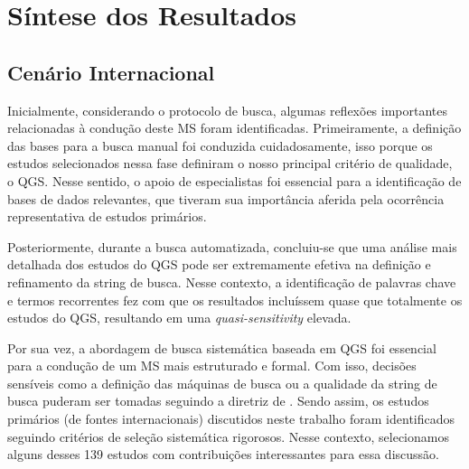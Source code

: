 


\section{Síntese dos Resultados}
\label{ms:sintese-resultados}

\subsection{Cenário Internacional}
\label{ms:cenario-internacional}

Inicialmente, considerando o protocolo de busca, algumas reflexões importantes relacionadas à condução deste MS foram identificadas. Primeiramente, a definição das bases para a busca manual foi conduzida cuidadosamente, isso porque os estudos selecionados nessa fase definiram o nosso principal critério de qualidade, o QGS. Nesse sentido, o apoio de especialistas foi essencial para a identificação de bases de dados relevantes, que tiveram sua importância aferida pela ocorrência representativa de estudos primários.


Posteriormente, durante a busca automatizada, concluiu-se que uma análise mais detalhada dos estudos do QGS pode ser extremamente efetiva na definição e refinamento da string de busca. Nesse contexto, a identificação de palavras chave e termos recorrentes fez com que os resultados incluíssem quase que totalmente os estudos do QGS, resultando em uma \textit{quasi-sensitivity} elevada.

Por sua vez, a abordagem de busca sistemática baseada em QGS foi essencial para a condução de um MS mais estruturado e formal. Com isso, decisões sensíveis como a definição das máquinas de busca ou a qualidade da string de busca puderam ser tomadas seguindo a diretriz de . Sendo assim, os estudos primários (de fontes internacionais) discutidos neste trabalho foram identificados seguindo critérios de seleção sistemática rigorosos. Nesse contexto, selecionamos alguns desses 139 estudos com contribuições interessantes para essa discussão.

